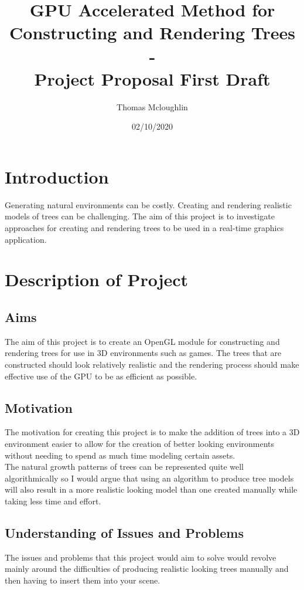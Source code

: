\documentclass[proposal]{cmpreport}
\title{GPU Accelerated Method for Constructing and Rendering Trees 
        \\ - \\ 
        Project Proposal First Draft}
\author{Thomas Mcloughlin}
\date{02/10/2020}
\begin{document}
\maketitle

\pagebreak
\section{Introduction}
Generating natural environments can be costly. Creating and rendering realistic 
models of trees can be challenging. The aim of this project is to investigate 
approaches for creating and rendering trees to be used in a real-time graphics 
application.

\section{Description of Project}

\subsection{Aims}
The aim of this project is to create an OpenGL module for constructing and rendering 
trees for use in 3D environments such as games. The trees that are constructed should 
look relatively realistic and the rendering process should make effective use of the 
GPU to be as efficient as possible.

\subsection{Motivation}
The motivation for creating this project is to make the addition of trees into a 3D 
environment easier to allow for the creation of better looking environments without 
needing to spend as much time modeling certain assets. \\
The natural growth patterns of trees can be represented quite well algorithmically so 
I would argue that using an algorithm to produce tree models will also result in a 
more realistic looking model than one created manually while taking less time and 
effort.

\subsection{Understanding of Issues and Problems}
The issues and problems that this project would aim to solve would revolve mainly 
around the difficulties of producing realistic looking trees manually and then having 
to insert them into your scene. \\
\end{document}
